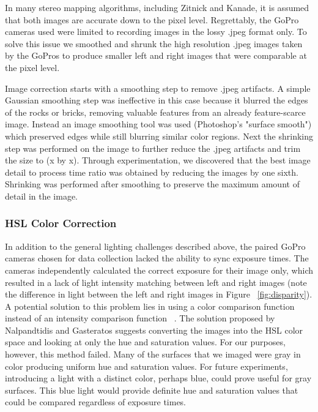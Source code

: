 \documentclass[a4paper,twoside]{article}
\begin{document}
In many stereo mapping algorithms, including Zitnick and Kanade, it is assumed that both images are accurate down to the pixel level.
Regrettably, the GoPro cameras used were limited to recording images in the lossy .jpeg format only.
To solve this issue we smoothed and shrunk the high resolution .jpeg images taken by the GoPros to produce smaller left and right images that were comparable at the pixel level.

Image correction starts with a smoothing step  to remove .jpeg artifacts. A simple Gaussian smoothing step was ineffective in this case because it blurred the edges of the rocks or bricks, removing valuable features from an already feature-scarce image. Instead an image smoothing tool was used (Photoshop's "surface smooth") which preserved edges while still blurring similar color regions. Next the shrinking step was performed on the image to further reduce the .jpeg artifacts and trim the size to (x by x). Through experimentation, we discovered that the best image detail to process time ratio was obtained by reducing the images by one sixth.
Shrinking was performed after smoothing to preserve the maximum amount of detail in the image.

\subsubsection{HSL Color Correction}
\label{subsec:hsl_color_correction}
In addition to the general lighting challenges described above, the paired GoPro cameras chosen for data collection lacked the ability to sync exposure times.
The cameras independently calculated the correct exposure for their image only, which resulted in a lack of light intensity matching between left and right images (note the difference in light between the left and right images in Figure ~\ref{fig:disparity}).
A potential solution to this problem lies in using a color comparison function instead of an intensity comparison function ~\cite{stereo:nalGast}.
The solution proposed by Nalpandtidis and Gasteratos suggests converting the images into the HSL color space and looking at only the hue and saturation values.
For our purposes, however, this method failed.  
Many of the surfaces that we imaged were gray in color producing uniform hue and saturation values.
For future experiments, introducing a light with a distinct color, perhaps blue, could prove useful for gray surfaces.  
This blue light would provide definite hue and saturation values that could be compared regardless of exposure times.
\end{document}
